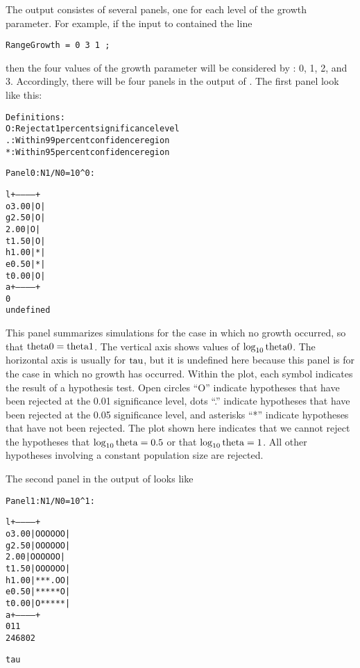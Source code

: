 The output consistes of several panels, one for each level of the
growth parameter.  For example, if the input to  contained
the line
\begin{verbatim}
RangeGrowth = 0 3 1 ;
\end{verbatim}
then the four values of the growth parameter will be considered by
: 0, 1, 2, and 3.  Accordingly, there will be four panels in
the output of .  The first panel look like this:
\begin{alltt}
\begin{minipage}{\textwidth}
Definitions:
 O : Reject at 1 percent significance level
 . : Within 99 percent confidence region
 * : Within 95 percent confidence region

Panel 0: N1/N0 = 10^0:

l          +-----------+
o    3.00  |      O    |
g    2.50  |      O    |
     2.00  |      O    |
t    1.50  |      O    |
h    1.00  |      *    |
e    0.50  |      *    |
t    0.00  |      O    |
a          +-----------+
0                       
              undefined 
\end{minipage}
\end{alltt}
This panel summarizes simulations for the case in which no growth
occurred, so that $\hbox{theta0} = \hbox{theta1}$.  The vertical axis shows values
of $\log_{10} \hbox{theta0}$.  The horizontal axis is usually for $\hbox{tau}$, but it
is undefined here because this panel is for the case in which no
growth has occurred.  Within the plot, each symbol indicates the
result of a hypothesis test.  Open circles ``O'' indicate hypotheses
that have been rejected at the 0.01 significance level, dots ``.''
indicate hypotheses that have been rejected at the 0.05 significance
level, and asterisks ``*'' indicate hypotheses that have not been
rejected.   The plot shown here indicates that we cannot reject the
hypotheses that $\log_{10} \hbox{theta} = 0.5$ or that $\log_{10} \hbox{theta} = 1$.  All
other hypotheses involving a constant population size are rejected.

The second panel in the output of  looks like
\begin{alltt}
\begin{minipage}{\textwidth}
Panel 1: N1/N0 = 10^1:

l          +-----------+
o    3.00  |O O O O O O|
g    2.50  |O O O O O O|
     2.00  |O O O O O O|
t    1.50  |O O O O O O|
h    1.00  |* * * . O O|
e    0.50  |* * * * * O|
t    0.00  |O * * * * *|
a          +-----------+
0                   1 1 
            2 4 6 8 0 2 
                        
                    tau 
\end{minipage}
\end{alltt}

